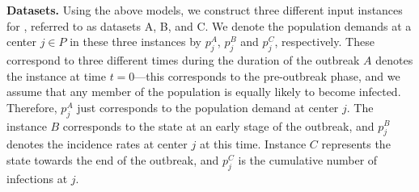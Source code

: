\noindent
\textbf{Datasets.}
Using the above models, we construct three different input instances for ,
referred to as datasets A, B, and C. 
We denote the population demands at a center $j\in P$ in these three instances
by $p_j^A$, $p_j^B$ and $p_j^C$, respectively.
These correspond to three different times during the duration of the outbreak
$A$ denotes the instance at time $t=0$---this
corresponds to the pre-outbreak phase, and 
we assume that any member of the population is equally likely to become infected.
Therefore, $p^A_j$ just corresponds to the population demand at center $j$.
The instance $B$ corresponds to the state at an early stage of the outbreak,
and $p^B_j$ denotes the incidence rates at center $j$ at this time.
Instance $C$ represents the state towards the end of the outbreak,
and $p^C_j$ is the cumulative number of infections at $j$.







